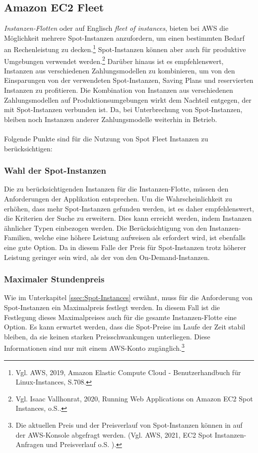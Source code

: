 \subsection{Amazon EC2 Fleet} \label{sssec:AWS-EC2-Fleet}%
\textit{Instanzen-Flotten} oder auf Englisch \textit{fleet of instances}, bieten bei AWS die Möglichkeit mehrere Spot-Instanzen anzufordern, um einen bestimmten Bedarf an Rechenleistung zu decken.\footnote{Vgl. AWS, 2019, Amazon Elastic Compute Cloud - Benutzerhandbuch für Linux-Instances, S.708\cite{AMZ26}.} Spot-Instanzen können aber auch für produktive Umgebungen verwendet werden.\footnote{Vgl. Isaac Vallhonrat, 2020, Running Web Applications on Amazon EC2 Spot Instances, o.S.\cite{AMZ24}.} Darüber hinaus ist es empfehlenswert, Instanzen aus verschiedenen Zahlungsmodellen zu kombinieren, um von den Einsparungen von der verwendeten Spot-Instanzen, Saving Plans und reservierten Instanzen zu profitieren. Die Kombination von Instanzen aus verschiedenen Zahlungsmodellen auf Produktionsumgebungen wirkt dem Nachteil entgegen, der mit Spot-Instanzen verbunden ist. Da, bei Unterbrechung von Spot-Instanzen, bleiben noch Instanzen anderer Zahlungsmodelle weiterhin in Betrieb.
\\\\
Folgende Punkte sind für die Nutzung von Spot Fleet Instanzen zu berücksichtigen:
\subsubsection*{Wahl der Spot-Instanzen}
Die zu berücksichtigenden Instanzen für die Instanzen-Flotte, müssen den Anforderungen der %
Applikation entsprechen. Um die Wahrscheinlichkeit zu erhöhen, dass mehr Spot-Instanzen gefunden werden, ist es daher empfehlenswert, die Kriterien der Suche zu erweitern. Dies kann erreicht werden, indem Instanzen ähnlicher Typen einbezogen werden. Die Berücksichtigung von den Instanzen-Familien, welche eine höhere Leistung aufweisen als erfordert wird, ist ebenfalls eine gute Option. Da in diesem Falle der Preis für Spot-Instanzen trotz höherer Leistung geringer sein wird, als der von den On-Demand-Instanzen\cite{AMZ24}. 

\subsubsection*{Maximaler Stundenpreis}
Wie im Unterkapitel \ref{ssec:Spot-Instances} erwähnt, muss für die Anforderung von Spot-Instanzen ein Maximalpreis festlegt werden. In diesem Fall ist die Festlegung dieses Maximalpreises auch für die gesamte Instanzen-Flotte eine Option. Es kann erwartet werden, dass die Spot-Preise im Laufe der Zeit stabil bleiben, da sie keinen starken Preisschwankungen unterliegen. Diese Informationen sind nur mit einem AWS-Konto zugänglich.\footnote{Die aktuellen Preis und der Preisverlauf von Spot-Instanzen können in auf der AWS-Konsole abgefragt werden. (Vgl. AWS, 2021, EC2 Spot Instanzen-Anfragen und Preisverlauf o.S. \cite{AMZ25}).}


